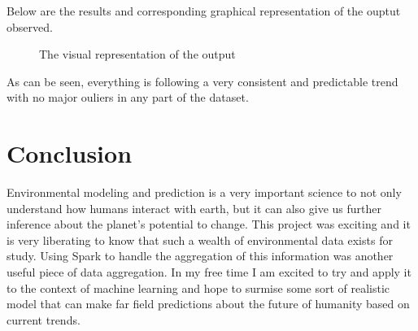 \documentclass[11pt]{article}
\begin{document}
Below are the results and corresponding graphical representation of the ouptut observed.
\begin{figure}[h!]
  \centering
  \qquad
  \caption{The visual representation of the output}
\end{figure}
As can be seen, everything is following a very consistent and predictable trend with no major ouliers in any part of the dataset.




\section{Conclusion}
Environmental modeling and prediction is a very important science to not only understand how humans interact with earth, but it
can also give us further inference about the planet's potential to change. This project was exciting and it is very liberating to
know that such a wealth of environmental data exists for study. Using Spark to handle the aggregation of this information was
another useful piece of data aggregation. In my free time I am excited to try and apply it to the context of machine learning
and hope to surmise some sort of realistic model that can make far field predictions about the future of humanity based on current
trends.
\end{document}

